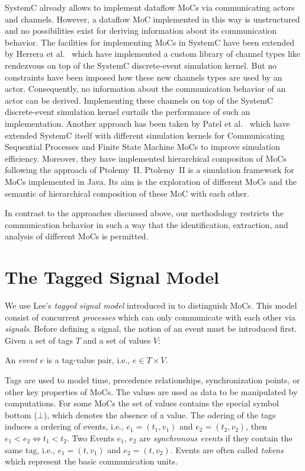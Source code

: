 SystemC \cite{glms:2002} already allows to implement
dataflow MoCs via communicating actors and  channels.
However, a dataflow MoC implemented in this way is unstructured
and no possibilities exist for deriving information about its
communication behavior. The facilities for implementing MoCs in
SystemC have been extended by Herrera et al.~\cite{herrerasystemc:2004}
which have implemented a custom library of channel types like rendezvous
on top of the SystemC discrete-event simulation kernel. But no
constraints have been imposed how these new channels types are used by
an actor. Consequently, no information about the communication
behavior of an actor can be derived.
Implementing these channels on top of the SystemC discrete-event
simulation kernel curtails the performance of such an implementation.
Another approach has been taken by Patel et al.~\cite{fermatmoc:2004}
which have extended SystemC itself with different simulation kernels
for Communicating Sequential Processes and Finite State Machine MoCs
to improve simulation efficiency. Moreover,
they have implemented hierarchical compositon of MoCs following
the approach of \hbox{Ptolemy II}. \hbox{Ptolemy II} \cite{ptolemyII} is a simulation
framework for MoCs implemented in Java. Its aim is the exploration of
different MoCs and the semantic of hierarchical composition of these MoC
with each other.

In contrast to the approaches discussed above, our methodology restricts
the communication behavior in such a way that the identification,
extraction, and analysis of different MoCs is permitted.

\section{The Tagged Signal Model}\label{lee-tsm}

We use Lee's \emph{tagged signal model} introduced in \cite{Lee98} to
distinguish MoCs. This model consist of concurrent \emph{processes} which
can only communicate with each other via \emph{signals}.
Before defining a signal, the notion of an event must be introduced first.
Given a set of tags $T$ and a set of values $V$:
\begin{sdefinition}
An \emph{event} $e$ is a  tag-value pair, i.e., $e \in T \times V$.
\end{sdefinition}
Tags are used to model time,
precedence relationships, synchronization points, or other key properties
of MoCs. The values are used as data to be manipulated by computations.
For some MoCs the set of values contains the special symbol bottom ($\bot$),
which denotes the absence of a value. The odering of the tags induces
a ordering of events, i.e., $e_1 = (t_1,v_1)$ and $e_2 = (t_2,v_2)$, then $e_1 < e_2 \iff t_1 < t_2$.
Two Events $e_1$, $e_2$ are \emph{synchronous events} if they contain
the same tag, i.e., $e_1 = (t,v_1)$ and $e_2 = (t,v_2)$.
Events are often called \emph{tokens} which represent the basic communication units.


